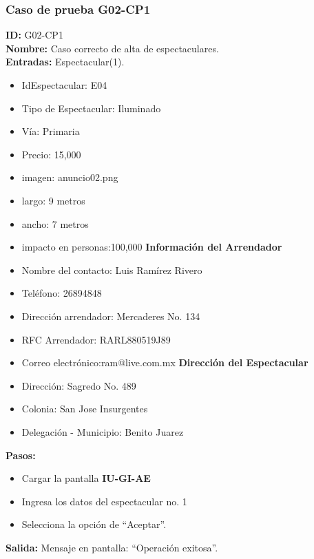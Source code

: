 \subsubsection{Caso de prueba G02-CP1}
\textbf{ID:} G02-CP1\\
\textbf{Nombre:} Caso correcto de alta de espectaculares.\\
\textbf{Entradas:}
Espectacular(1). 
\begin{itemize}
    \item IdEspectacular: E04
    \item Tipo de Espectacular: Iluminado
    \item Vía: Primaria
    \item Precio: 15,000
    \item imagen: anuncio02.png
    \item largo: 9 metros
    \item ancho: 7 metros
    \item impacto en personas:100,000
    \textbf{Información del Arrendador}
    \item Nombre del contacto: Luis Ramírez Rivero
    \item Teléfono: 26894848
    \item Dirección arrendador: Mercaderes No. 134
    \item RFC Arrendador: RARL880519J89
    \item Correo electrónico:ram@live.com.mx
    \textbf{Dirección del Espectacular}
    \item Dirección: Sagredo No. 489
    \item Colonia: San Jose Insurgentes
    \item Delegación - Municipio: Benito Juarez
\end{itemize}

\textbf{Pasos:}
\begin{itemize}
    \item Cargar la pantalla \textbf{IU-GI-AE}
    \item Ingresa los datos del espectacular no. 1
    \item Selecciona la opción de ``Aceptar''.
\end{itemize}
\textbf{Salida:}
Mensaje en pantalla: ``Operación exitosa''.
    
    
